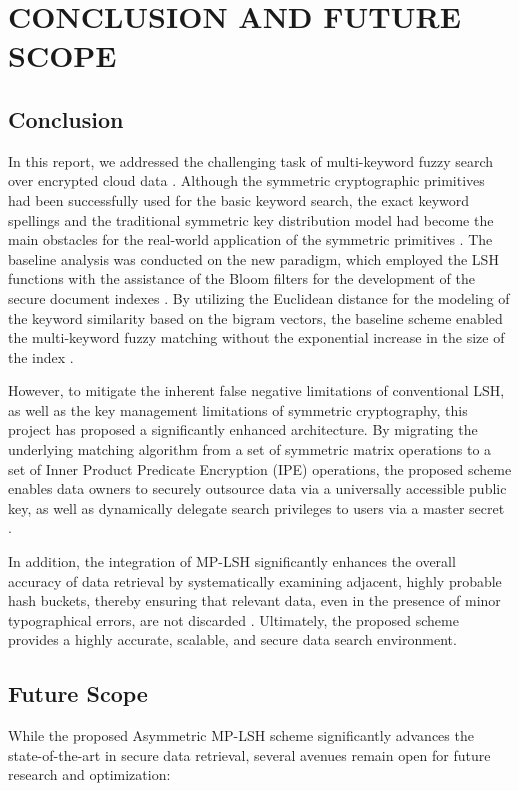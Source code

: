 \chapter{CONCLUSION AND FUTURE SCOPE}
\graphicspath{{Chapter5/}}

\section{Conclusion}
In this report, we addressed the challenging task of multi-keyword fuzzy search over encrypted cloud data \cite{wang2014privacy}.%
Although the symmetric cryptographic primitives had been successfully used for the basic keyword search, the exact keyword spellings and the traditional symmetric key distribution model had become the main obstacles for the real-world application of the symmetric primitives \cite{song2000practical, li2010fuzzy}.%
The baseline analysis was conducted on the new paradigm, which employed the LSH functions with the assistance of the Bloom filters for the development of the secure document indexes \cite{wang2014privacy, bloom1970space}.%
By utilizing the Euclidean distance for the modeling of the keyword similarity based on the bigram vectors, the baseline scheme enabled the multi-keyword fuzzy matching without the exponential increase in the size of the index \cite{wang2014privacy, datar2004locality}.%

However, to mitigate the inherent false negative limitations of conventional LSH, as well as the key management limitations of symmetric cryptography, this project has proposed a significantly enhanced architecture. By migrating the underlying matching algorithm from a set of symmetric matrix operations to a set of Inner Product Predicate Encryption (IPE) operations, the proposed scheme enables data owners to securely outsource data via a universally accessible public key, as well as dynamically delegate search privileges to users via a master secret \cite{shen2009predicate}.

In addition, the integration of MP-LSH significantly enhances the overall accuracy of data retrieval by systematically examining adjacent, highly probable hash buckets, thereby ensuring that relevant data, even in the presence of minor typographical errors, are not discarded \cite{lv2007multi}. Ultimately, the proposed scheme provides a highly accurate, scalable, and secure data search environment.

\section{Future Scope}
While the proposed Asymmetric MP-LSH scheme significantly advances the state-of-the-art in secure data retrieval, several avenues remain open for future research and optimization:


